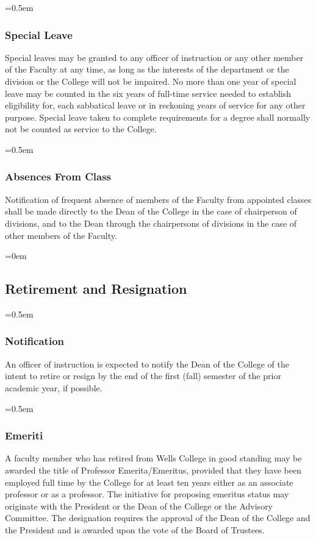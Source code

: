 \documentclass{manual}
\let\oldsubsection\subsection
\renewcommand\subsection{\leftskip=0em\oldsubsection}
\let\oldsubsubsection\subsubsection
\renewcommand\subsubsection{\leftskip=0.5em\oldsubsubsection}
\begin{document}
\subsubsection{Special Leave}\label{sec:FacultyCommittees.B}
Special leaves may be granted to any officer of instruction or any other member of the Faculty at any time, as long as the interests of the department or the division or the College will not be impaired. No more than one year of special leave may be counted in the six years of full-time service needed to establish eligibility for, each sabbatical leave or in reckoning years of service for any other purpose. Special leave taken to complete requirements for a degree shall normally not be counted as service to the College.

\subsubsection{Absences From Class}
Notification of frequent absence of members of the Faculty from appointed classes shall be made directly to the Dean of the College in the case of chairperson of divisions, and to the Dean through the chairpersons of divisions in the case of other members of the Faculty.

\subsection{Retirement and Resignation}

\subsubsection{Notification}
An officer of instruction is expected to notify the Dean of the College of the intent to retire or resign by the end of the first (fall) semester of the prior academic year, if possible.

\subsubsection{Emeriti}
A faculty member who has retired from Wells College in good standing may be awarded the title of Professor Emerita/Emeritus, provided that they have been employed full time by the College for at least ten years either as an associate professor or as a professor. The initiative for proposing emeritus status may originate with the President or the Dean of the College or the Advisory Committee. The designation requires the approval of the Dean of the College and the President and is awarded upon the vote of the Board of Trustees.
\end{document}
